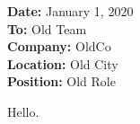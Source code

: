 \documentclass{article}
\begin{document}
\noindent \textbf{Date:} January 1, 2020 \\
\textbf{To:} Old Team \\
\textbf{Company:} OldCo \\
\textbf{Location:} Old City \\
\textbf{Position:} Old Role

Hello.
\end{document}
